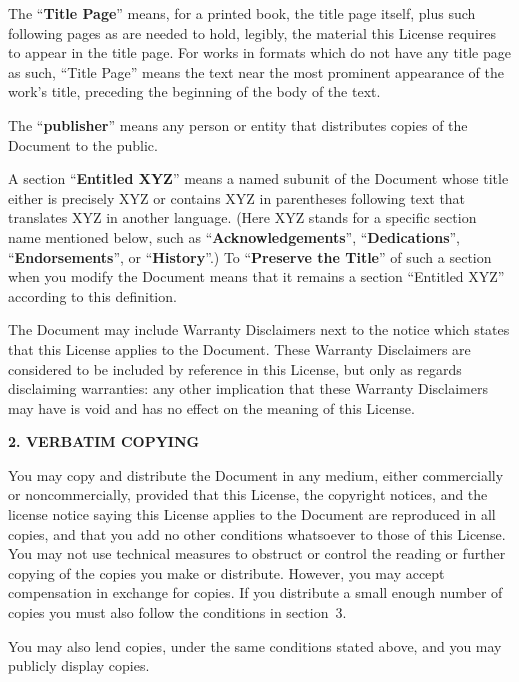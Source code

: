 \documentclass[]{report}
\theoremstyle{definition}
\theoremstyle{remark}
\theoremstyle{plain}
\numberwithin{equation}{chapter}
\begin{document}
\begin{multicols*}{2}
The ``\textbf{Title Page}'' means, for a printed book, the title page itself,
plus such following pages as are needed to hold, legibly, the material
this License requires to appear in the title page.  For works in
formats which do not have any title page as such, ``Title Page'' means
the text near the most prominent appearance of the work's title,
preceding the beginning of the body of the text.

The ``\textbf{publisher}'' means any person or entity that distributes
copies of the Document to the public.

A section ``\textbf{Entitled XYZ}'' means a named subunit of the Document whose
title either is precisely XYZ or contains XYZ in parentheses following
text that translates XYZ in another language.  (Here XYZ stands for a
specific section name mentioned below, such as ``\textbf{Acknowledgements}'',
``\textbf{Dedications}'', ``\textbf{Endorsements}'', or ``\textbf{History}''.)  
To ``\textbf{Preserve the Title}''
of such a section when you modify the Document means that it remains a
section ``Entitled XYZ'' according to this definition.

The Document may include Warranty Disclaimers next to the notice which
states that this License applies to the Document.  These Warranty
Disclaimers are considered to be included by reference in this
License, but only as regards disclaiming warranties: any other
implication that these Warranty Disclaimers may have is void and has
no effect on the meaning of this License.


\begin{center}
	{\footnotesize\bf 2. VERBATIM COPYING\par}
\end{center}

You may copy and distribute the Document in any medium, either
commercially or noncommercially, provided that this License, the
copyright notices, and the license notice saying this License applies
to the Document are reproduced in all copies, and that you add no other
conditions whatsoever to those of this License.  You may not use
technical measures to obstruct or control the reading or further
copying of the copies you make or distribute.  However, you may accept
compensation in exchange for copies.  If you distribute a small enough
number of copies you must also follow the conditions in section~3.

You may also lend copies, under the same conditions stated above, and
you may publicly display copies.



\end{multicols*}
\end{document}
